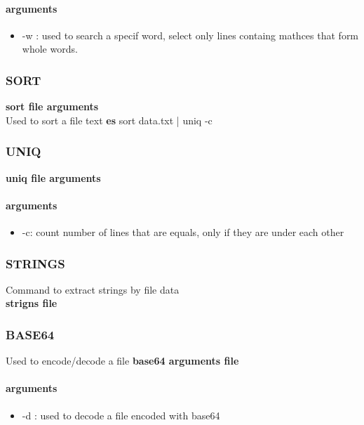 \documentclass{article}
\begin{document}
                    \paragraph{arguments}
                    \begin{itemize}
        
                        \item -w : used to search a specif word, select only lines containg mathces that form whole words. 
                    \end{itemize}
                \subsubsection{SORT}
                    \textbf{sort file arguments}\\
                    Used to sort a file text \textbf{es} sort data.txt | uniq -c
                \subsubsection{UNIQ}
                    \textbf{uniq file arguments}\\
                    \paragraph{arguments}   
                    \begin{itemize}
                        \item -c: count number of lines that are equals, only if they are under each other
                    \end{itemize}
                \subsubsection{STRINGS}
                    Command to extract strings by file data\\
                    \textbf{strigns file}
                \subsubsection{BASE64}
                    Used to encode/decode a file
                    \textbf{base64 arguments file}
                    \paragraph{arguments}
                    \begin{itemize}
                        \item -d : used to decode a file encoded with base64
                    \end{itemize}
\end{document}
